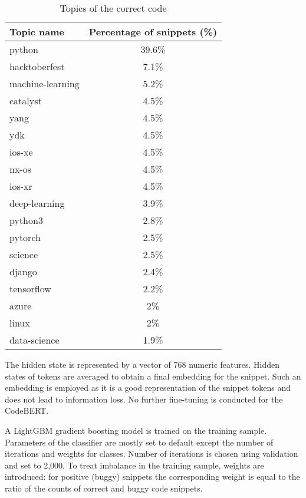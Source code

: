 \documentclass[10pt,conference]{IEEEtran}
\begin{document}
\begin{table}[htbp]
\caption{Topics of the correct code}
\begin{center}
\renewcommand{\arraystretch}{1.2}
\begin{tabular}{| l | c |}
\hline
  \textbf{Topic name}  & \textbf{Percentage of snippets (\%)} \\
\hline
  python & 39.6\color{lightgray}\% \\
\hline
  hacktoberfest & 7.1\color{lightgray}\% \\
\hline
  machine-learning  & 5.2\color{lightgray}\% \\
\hline
  catalyst & 4.5\color{lightgray}\% \\
\hline
  yang & 4.5\color{lightgray}\% \\
\hline
  ydk &   4.5\color{lightgray}\% \\
\hline
   ios-xe &  4.5\color{lightgray}\% \\
\hline
  nx-os &  4.5\color{lightgray}\% \\
\hline
  ios-xr &  4.5\color{lightgray}\% \\
\hline
  deep-learning &  3.9\color{lightgray}\% \\
\hline
  python3 &  2.8\color{lightgray}\% \\
\hline
  pytorch &  2.5\color{lightgray}\% \\
\hline
  science &  2.5\color{lightgray}\% \\
\hline
  django &  2.4\color{lightgray}\% \\
\hline
  tensorflow &  2.2\color{lightgray}\% \\
\hline
  azure  &  2\color{lightgray}\% \\
\hline
   linux &  2\color{lightgray}\% \\
\hline
  data-science &  1.9\color{lightgray}\% \\
\hline
\end{tabular}
\label{tab6}
\end{center}
\end{table}

The hidden state is represented by a vector of 768 numeric features.
Hidden states of tokens are averaged to obtain a final embedding for the snippet. 
Such an embedding is employed as it is a good representation of the snippet tokens and does not lead to information loss.
No further fine-tuning is conducted for the CodeBERT.
 
A LightGBM gradient boosting model is trained on the training sample.
Parameters of the classifier are mostly set to default except the number of iterations and weights for classes. 
Number of iterations is chosen using validation and set to 2,000. To treat imbalance in the training sample,
weights are introduced: for positive (buggy) snippets the corresponding weight is equal to the ratio of the counts of correct and buggy code snippets.
\end{document}
